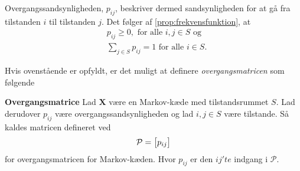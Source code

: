 Overgangssandsynligheden, $p_{ij}$, beskriver dermed sandsynligheden for at gå fra tilstanden $i$ til tilstanden $j$. Det følger af \autoref{prop:frekvensfunktion}, at
%
\begin{align*}
    &p_{ij}\geq 0, \text{ for alle } i,j\in S \text{ og}\\
    &\sum_{j\in S} p_{ij}=1 \text{ for alle } i\in S.
\end{align*}

%

Hvis ovenstående er opfyldt, er det muligt at definere \textit{overgangsmatricen} som følgende

\begin{minipage}\textwidth
\begin{defn}\textbf{Overgangsmatrice}\label{def:ovegangsmatrice} %
\newline
Lad $\bm X$ være en Markov-kæde med tilstandsrummet $S$. Lad derudover $p_{ij}$ være overgangssandsynligheden og lad $i,j \in S$ være tilstande. Så kaldes matricen defineret ved
\begin{align*}
    \P = \left[p_{ij}\right]
\end{align*}
for overgangsmatricen for Markov-kæden. Hvor $p_{ij}$ er den $ij'te$ indgang i $\mathcal{P}$.
\end{defn}
\end{minipage}




